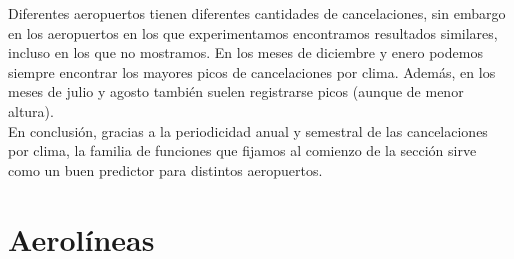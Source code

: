 Diferentes aeropuertos tienen diferentes cantidades de cancelaciones, sin embargo en los aeropuertos en los que experimentamos encontramos resultados similares, incluso en los que no mostramos. En los meses de diciembre y enero podemos siempre encontrar los mayores picos de cancelaciones por clima. Además, en los meses de julio y agosto también suelen registrarse picos (aunque de menor altura). \\

En conclusión, gracias a la periodicidad anual y semestral de las cancelaciones por clima, la familia de funciones que fijamos al comienzo de la sección sirve como un buen predictor para distintos aeropuertos. \\

\section{Aerolíneas}
